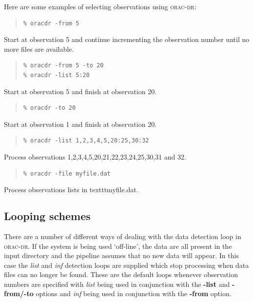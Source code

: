 \documentclass[twoside,11pt]{article}
\newcommand{\xref}[3]{#1}
\newcommand{\xlabel}[1]{}
\renewcommand{\_}{\texttt{\symbol{95}}}
\newcommand{\oracdr}{\xref{\textsc{orac-dr}}{sun230}{}}
\newenvironment{myquote}{\begin{quote}\begin{small}}{\end{small}\end{quote}}
\begin{document}
Here are some examples of selecting observations using \oracdr:

\begin{myquote}
\begin{verbatim}
% oracdr -from 5
\end{verbatim}
\end{myquote}
Start at observation 5 and continue incrementing the observation number
until no more files are available.
\begin{myquote}
\begin{verbatim}
% oracdr -from 5 -to 20
% oracdr -list 5:20
\end{verbatim}
\end{myquote}
Start at observation 5 and finish at observation 20.

\begin{myquote}
\begin{verbatim}
% oracdr -to 20
\end{verbatim}
\end{myquote}
Start at observation 1 and finish at observation 20.

\begin{myquote}
\begin{verbatim}
% oracdr -list 1,2,3,4,5,20:25,30:32
\end{verbatim}
\end{myquote}
Process observations 1,2,3,4,5,20,21,22,23,24,25,30,31 and 32.

\begin{myquote}
\begin{verbatim}
% oracdr -file myfile.dat
\end{verbatim}
\end{myquote}

Process observations lists in texttt{myfile.dat}.

\subsection{Looping schemes\xlabel{looping_schemes}}

There are a number of different ways of dealing with the data detection
loop in \oracdr. If the system is being used `off-line', the data are
all present in the input directory and the pipeline assumes that no new
data will appear. In this case the \textit{list} and \textit{inf} detection
loops are supplied which stop processing when data files can no longer
be found. These are the default loops whenever observation
numbers are specified with \textit{list} being used in conjunction with the
\textbf{-list} and \textbf{-from/-to} options and \textit{inf} being
used in conjunction with the \textbf{-from} option.
\end{document}
